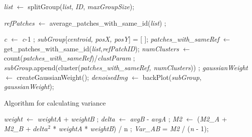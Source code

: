\documentclass[fleqn,10pt]{wlscirep}
\begin{document}
\begin{algorithm}
\begin{algorithmic}[1]
		
		\State \textit{list} $\gets$ splitGroup(\textit{list}, \textit{ID}, \textit{maxGroupSize});
		
		
		\EndIf
		
		\EndFor
		
		\State \textit{refPatches} $\gets$ average\_patches\_with\_same\_id(\textit{list}) ;
		
		\State \textit{c} $\gets$ \textit{c}-1 ;
		\EndFor
		\State \textit{subGroup}[\textit{centroid, posX, posY}] = [ ];
		\State \textit{patches\_with\_sameRef} $\gets$ get\_patches\_with\_same\_id(\textit{list},\textit{refPatchID});
		\State \textit{numClusters} $\gets$ count(\textit{patches\_with\_sameRef})/\textit{clustParam} ;
		\State \textit{subGroup}.append(cluster(\textit{patches\_with\_sameRef, numClusters})) ;
		\EndFor
		\State \textit{gaussianWeight} $\gets$ createGaussianWeight();
		\State \textit{denoisedImg} $\gets$ backPlot(\textit{subGroup}, \textit{gaussianWeight});
	\end{algorithmic}
\end{algorithm}

\clearpage

\begin{algorithm}
	\caption{Algorithm for calculating variance}
	\label{algorithm:variance_algorithm}
	\begin{algorithmic}[1]
		\State \textit{weight} $\gets$ \textit{weightA} + \textit{weightB} ;
		\State \textit{delta} $\gets$ \textit{avgB} - \textit{avgA} ;
		\State \textit{M2} $\gets$ (\textit{M2\_A} + \textit{M2\_B} + $delta^2$ *  \textit{weightA} * \textit{weightB}) / n ;
		\State \textit{Var\_AB} = \textit{M2} / (\textit{n} - 1);
	\end{algorithmic}	
\end{algorithm}
\end{document}
